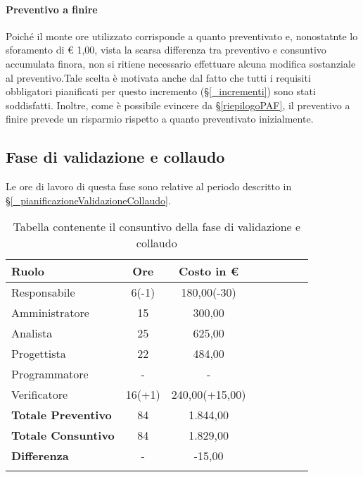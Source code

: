 \paragraph{Preventivo a finire}
Poiché il monte ore utilizzato corrisponde a quanto preventivato e, nonostatnte lo sforamento di € 1,00, vista la scarsa differenza tra preventivo e consuntivo accumulata finora, non si ritiene necessario effettuare alcuna modifica sostanziale al preventivo.Tale scelta è motivata anche dal fatto che tutti i requisiti obbligatori pianificati per questo incremento (\S\ref{_incrementi}) sono stati soddisfatti. Inoltre, come è possibile evincere da \S\ref{riepilogoPAF}, il preventivo a finire prevede un risparmio rispetto a quanto preventivato inizialmente.

\subsection{Fase di validazione e collaudo} \label{_consuntivoValidazione}
Le ore di lavoro di questa fase sono relative al periodo descritto in \S\ref{_pianificazioneValidazioneCollaudo}.

\begin{longtable}{|l|c|c|c|c|c|c|c|}
	\hline
	\rowcolor{lighter-grayer}
	\textbf{Ruolo}             & \textbf{Ore} & \textbf{Costo in €} \\
	\hline
	\endfirsthead

	\hline
	Responsabile               & 6(-1)           & 180,00(-30)              \\
	\hline
	\hline
	Amministratore             & 15       & 300,00      \\
	\hline
	\hline
	Analista                   & 25       & 625,00   \\
	\hline
	\hline
	Progettista                & 22            & 484,00              \\
	\hline
	\hline
	Programmatore              & -            & -                   \\
	\hline
	\hline
	Verificatore               & 16(+1)       & 240,00(+15,00)    \\
	\hline
	\textbf{Totale Preventivo} & 84          & 1.844,00            \\
	\hline
	\hline
	\textbf{Totale Consuntivo} & 84          & 1.829,00            \\
	\hline
	\hline
	\textbf{Differenza}        & -           & -15,00           \\
	\hline
	\rowcolor{white}
	\caption{Tabella contenente il consuntivo della fase di validazione e collaudo}
\end{longtable}
